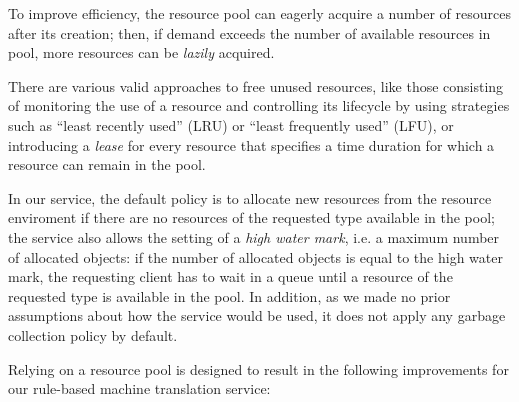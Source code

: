 \documentclass[11pt]{article}
\begin{document}
To improve efficiency, the resource pool can eagerly acquire a number of resources after its 
creation; then, if demand exceeds the number of available resources in pool, more resources can
be \emph{lazily} acquired.

There are various valid approaches to free unused resources, like those consisting of monitoring 
the use of a resource and controlling its lifecycle by using  strategies such as ``least recently 
used'' (LRU) or ``least frequently used'' (LFU), or introducing a \emph{lease} for every resource 
that specifies a time duration for which a resource can remain in the pool.

In our service, the default policy is to allocate new resources from the resource enviroment if 
there are no resources of the requested type available in the pool; the service also allows the 
setting of a \emph{high water mark}, i.e. a maximum number of allocated objects: if the number of 
allocated objects is equal to the high water mark, the requesting client has to wait in a queue 
until a resource of the requested type is available in the pool. In addition, as we made no prior 
assumptions about how the service would be used, it does not apply any garbage collection policy 
by default.

Relying on a resource pool is designed to result in the following improvements for our 
rule-based machine translation service:
\end{document}
